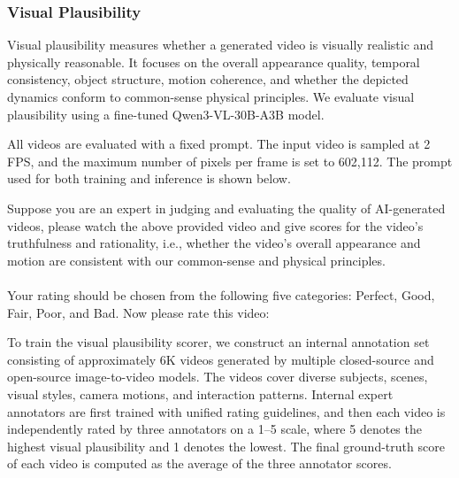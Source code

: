 \subsubsection{Visual Plausibility}
\label{app:visual_plausibility_detail}

Visual plausibility measures whether a generated video is visually realistic and physically reasonable. It focuses on the overall appearance quality, temporal consistency, object structure, motion coherence, and whether the depicted dynamics conform to common-sense physical principles. We evaluate visual plausibility using a fine-tuned Qwen3-VL-30B-A3B model.

All videos are evaluated with a fixed prompt. The input video is sampled at 2 FPS, and the maximum number of pixels per frame is set to 602,112. The prompt used for both training and inference is shown below.

\begin{tcolorbox}[d5box, title={Visual Plausibility --- Fine-tuned Qwen3-VL-30B-A3B}]
\ttfamily\scriptsize
Suppose you are an expert in judging and evaluating the quality of AI-generated videos, please watch the above provided video and give scores for the video's truthfulness and rationality, i.e., whether the video's overall appearance and motion are consistent with our common-sense and physical principles.\\
\\
Your rating should be chosen from the following five categories: Perfect, Good, Fair, Poor, and Bad. Now please rate this video:
\end{tcolorbox}

To train the visual plausibility scorer, we construct an internal annotation set consisting of approximately 6K videos generated by multiple closed-source and open-source image-to-video models. The videos cover diverse subjects, scenes, visual styles, camera motions, and interaction patterns. Internal expert annotators are first trained with unified rating guidelines, and then each video is independently rated by three annotators on a 1--5 scale, where 5 denotes the highest visual plausibility and 1 denotes the lowest. The final ground-truth score of each video is computed as the average of the three annotator scores.


